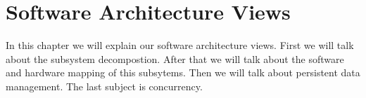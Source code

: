 \chapter{Software Architecture Views}

In this chapter we will explain our software architecture views. First we will talk about the subsystem decompostion. After that we will talk about the software and hardware mapping of this subsytems. Then we will talk about persistent data management. The last subject is concurrency.




